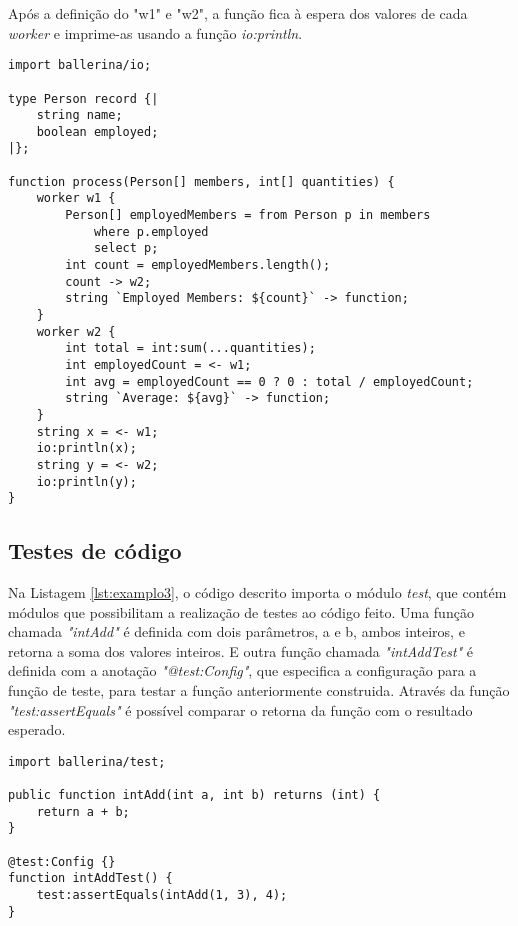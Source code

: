 Após a definição do "w1" e "w2", a função fica à espera dos valores de cada \textit{worker} e imprime-as usando a função \textit{io:println}.

\begin{minipage}{0.9\linewidth}
\begin{lstlisting}[language=ballerina, caption=Exemplo de concorrência. \cite{exemploB2}, label=lst:examplo2]
import ballerina/io;

type Person record {|
    string name;
    boolean employed;
|};

function process(Person[] members, int[] quantities) {
    worker w1 {
        Person[] employedMembers = from Person p in members
            where p.employed
            select p;
        int count = employedMembers.length();
        count -> w2;
        string `Employed Members: ${count}` -> function;
    }
    worker w2 {
        int total = int:sum(...quantities);
        int employedCount = <- w1;
        int avg = employedCount == 0 ? 0 : total / employedCount;
        string `Average: ${avg}` -> function;
    }
    string x = <- w1;
    io:println(x);
    string y = <- w2;
    io:println(y);
}
\end{lstlisting}
\end{minipage}

\subsection{Testes de código}

Na Listagem \ref{lst:examplo3}, o código descrito importa o módulo \textit{test}, que contém módulos que possibilitam a realização de testes ao código feito. Uma função chamada \textit{"intAdd"} é definida com dois parâmetros, a e b, ambos inteiros, e retorna a soma dos valores inteiros. E outra função chamada \textit{"intAddTest"} é definida com a anotação \textit{"@test:Config"}, que especifica a configuração para a função de teste, para testar a função anteriormente construida. Através da função \textit{"test:assertEquals"} é possível comparar o retorna da função com o resultado esperado.


\begin{minipage}{0.9\linewidth}
\begin{lstlisting}[language=ballerina, caption=Exemplo de um teste desenvolvido. \cite{exemploB3}, label=lst:examplo3]
import ballerina/test;

public function intAdd(int a, int b) returns (int) {
    return a + b;
}

@test:Config {}
function intAddTest() {
    test:assertEquals(intAdd(1, 3), 4);
}
\end{lstlisting}
\end{minipage}


